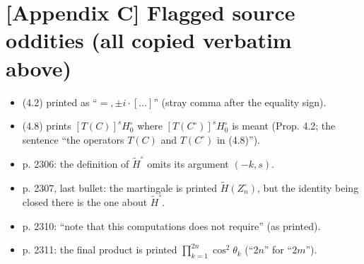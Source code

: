 \documentclass[11pt]{article}
\newcommand{\Htil}{\widetilde{H}}
\newcommand{\Htilo}{\widetilde{H}^{\circ}}
\begin{document}
\section*{[Appendix C] Flagged source oddities (all copied verbatim above)}
\begin{itemize}
\item (4.2) printed as ``$= ,\pm i\cdot[\dots]$'' (stray comma after the equality sign).
\item (4.8) prints $[T(C)]^sH_0^{\circ}$ where $[T(C^{\circ})]^sH_0^{\circ}$ is meant
      (Prop. 4.2; the sentence ``the operators $T(C)$ and $T(C^{\circ})$ in (4.8)'').
\item p. 2306: the definition of $\Htilo$ omits its argument $(-k,s)$.
\item p. 2307, last bullet: the martingale is printed $\Htil(Z_n^{\circ})$, but the
      identity being closed there is the one about $\Htilo$.
\item p. 2310: ``note that this computations does not require'' (as printed).
\item p. 2311: the final product is printed $\prod_{k=1}^{2n}\cos^2\theta_k$ (``$2n$'' for ``$2m$'').
\end{itemize}
\end{document}
